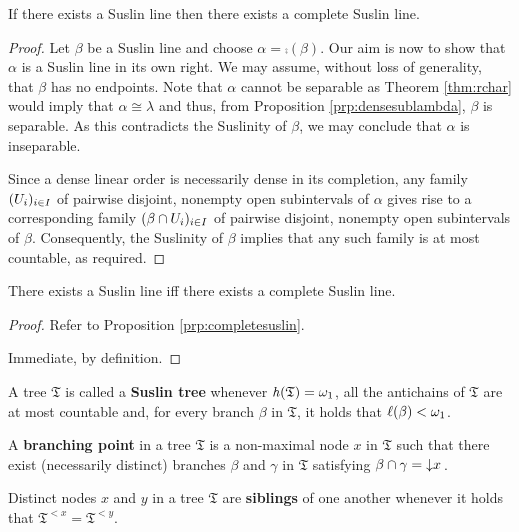 \begin{prp}\label{prp:completesuslin}
	If there exists a Suslin line then there exists a complete Suslin line.
\end{prp}
\begin{proof}
	Let $\beta$ be a Suslin line and choose $\alpha=\comp(\beta)$.  Our aim is
	now to show that $\alpha$ is a Suslin line in its own right.  We may assume,
	without loss of generality, that $\beta$ has no endpoints.  Note that $\alpha$
	cannot be separable as Theorem \ref{thm:rchar} would imply that
	$\alpha\cong\lambda$ and thus, from Proposition \ref{prp:densesublambda},
	$\beta$ is separable.  As this contradicts the Suslinity of $\beta$, we may
	conclude that $\alpha$ is inseparable.


	Since a dense linear order is necessarily dense in its completion, any
	family $(U_{i})_{i\in I}$ of pairwise disjoint, nonempty open
	subintervals of $\alpha$ gives rise to a corresponding family
	$(\beta\cap U_{i})_{i\in I}$ of pairwise disjoint, nonempty open
	subintervals of $\beta$.  Consequently, the Suslinity of $\beta$ implies
	that any such family is at most countable, as required.
\end{proof}

\begin{cor}
	There exists a Suslin line iff there exists a complete Suslin line.
\end{cor}
\begin{proof}
	\forward Refer to Proposition \ref{prp:completesuslin}.

	\backward Immediate, by definition.
\end{proof}

\begin{dfn}
	A tree $\mathfrak{T}$ is called a \textbf{Suslin tree} whenever
	$\mathit{h}(\mathfrak{T})=\omega_1$, all the antichains of $\mathfrak{T}$ are at
	most countable and, for every branch $\beta$ in $\mathfrak{T}$, it holds that
	$\ell(\beta)<\omega_1$.
\end{dfn}

\begin{dfn}
	A \textbf{branching point} in a tree $\mathfrak{T}$ is a non-maximal node
	$x$ in $\mathfrak{T}$ such that there exist (necessarily distinct) branches
	$\beta$ and $\gamma$ in $\mathfrak{T}$ satisfying $\beta\cap\gamma=\left\downarrow x\right.$.
\end{dfn}

\begin{dfn}[Siblings]
	Distinct nodes $x$ and $y$ in a tree $\mathfrak{T}$ are \textbf{siblings} of
	one another whenever it holds that $\mathfrak{T}^{<x}=\mathfrak{T}^{<y}$.
\end{dfn}

